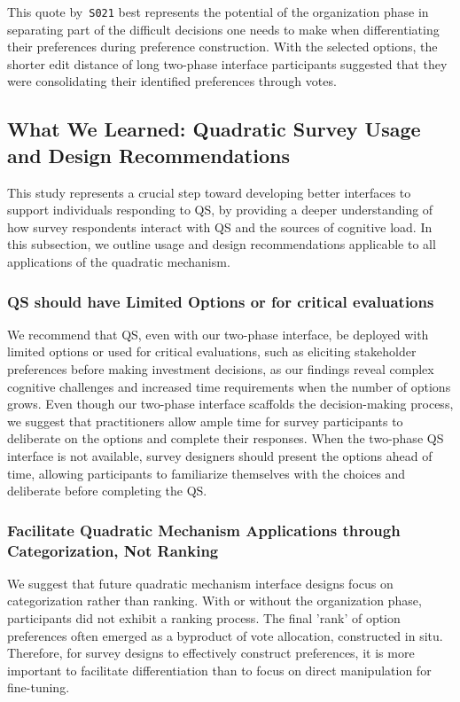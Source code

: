 This quote by~\texttt{S021} best represents the potential of the organization phase in separating part of the difficult decisions one needs to make when differentiating their preferences during preference construction. With the selected options, the shorter edit distance of long two-phase interface participants suggested that they were consolidating their identified preferences through votes.



\subsection{What We Learned: Quadratic Survey Usage and Design Recommendations}
This study represents a crucial step toward developing better interfaces to support individuals responding to QS, by providing a deeper understanding of how survey respondents interact with QS and the sources of cognitive load. In this subsection, we outline usage and design recommendations applicable to all applications of the quadratic mechanism.

\subsubsection{QS should have Limited Options or for critical evaluations}
We recommend that QS, even with our two-phase interface, be deployed with limited options or used for critical evaluations, such as eliciting stakeholder preferences before making investment decisions, as our findings reveal complex cognitive challenges and increased time requirements when the number of options grows. Even though our two-phase interface scaffolds the decision-making process, we suggest that practitioners allow ample time for survey participants to deliberate on the options and complete their responses. When the two-phase QS interface is not available, survey designers should present the options ahead of time, allowing participants to familiarize themselves with the choices and deliberate before completing the QS.

\subsubsection{Facilitate Quadratic Mechanism Applications through Categorization, Not Ranking}
We suggest that future quadratic mechanism interface designs focus on categorization rather than ranking. With or without the organization phase, participants did not exhibit a ranking process. The final 'rank' of option preferences often emerged as a byproduct of vote allocation, constructed in situ. Therefore, for survey designs to effectively construct preferences, it is more important to facilitate differentiation than to focus on direct manipulation for fine-tuning.

